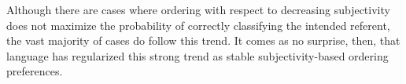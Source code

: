 \documentclass[preprint,authoryear]{elsarticle}\frenchspacing
\newcommand{\gcs}[1]{\textcolor{blue}{[gcs: #1]}}
\begin{document}
Although there are cases where ordering with respect to decreasing subjectivity does not maximize the probability of correctly classifying the intended referent, the vast majority of cases do follow this trend. It comes as no surprise, then, that language has regularized this strong trend as stable subjectivity-based ordering preferences. 
%
%
%
%
%
%
\end{document}
